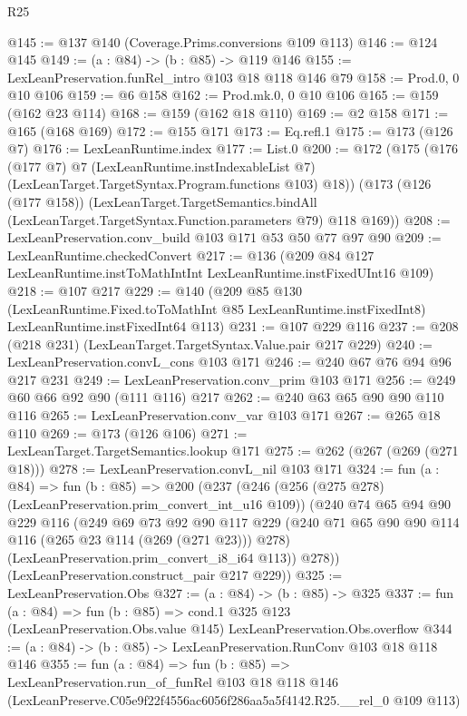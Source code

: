 \begin{lexlean}{R25}
\begin{coremodule}
@145 := @137 @140 (Coverage.Prims.conversions @109 @113)
@146 := @124 @145
@149 := (a : @84) -> (b : @85) -> @119 @146
@155 := LexLeanPreservation.funRel_intro @103 @18 @118 @146 @79
@158 := Prod.{0, 0} @10 @106
@159 := @6 @158
@162 := Prod.mk.{0, 0} @10 @106
@165 := @159 (@162 @23 @114)
@168 := @159 (@162 @18 @110)
@169 := @2 @158
@171 := @165 (@168 @169)
@172 := @155 @171
@173 := Eq.refl.{1}
@175 := @173 (@126 @7)
@176 := LexLeanRuntime.index
@177 := List.{0}
@200 := @172
    (@175
      (@176
        (@177 @7)
        @7
        (LexLeanRuntime.instIndexableList @7)
        (LexLeanTarget.TargetSyntax.Program.functions @103)
        @18))
    (@173
      (@126 (@177 @158))
      (LexLeanTarget.TargetSemantics.bindAll
        (LexLeanTarget.TargetSyntax.Function.parameters @79)
        @118
        @169))
@208 := LexLeanPreservation.conv_build @103 @171 @53 @50 @77 @97 @90
@209 := LexLeanRuntime.checkedConvert
@217 := @136 (@209 @84 @127 LexLeanRuntime.instToMathIntInt LexLeanRuntime.instFixedUInt16 @109)
@218 := @107 @217
@229 := @140
    (@209
      @85
      @130
      (LexLeanRuntime.Fixed.toToMathInt @85 LexLeanRuntime.instFixedInt8)
      LexLeanRuntime.instFixedInt64
      @113)
@231 := @107 @229 @116
@237 := @208 (@218 @231) (LexLeanTarget.TargetSyntax.Value.pair @217 @229)
@240 := LexLeanPreservation.convL_cons @103 @171
@246 := @240 @67 @76 @94 @96 @217 @231
@249 := LexLeanPreservation.conv_prim @103 @171
@256 := @249 @60 @66 @92 @90 (@111 @116) @217
@262 := @240 @63 @65 @90 @90 @110 @116
@265 := LexLeanPreservation.conv_var @103 @171
@267 := @265 @18 @110
@269 := @173 (@126 @106)
@271 := LexLeanTarget.TargetSemantics.lookup @171
@275 := @262 (@267 (@269 (@271 @18)))
@278 := LexLeanPreservation.convL_nil @103 @171
@324 := fun (a : @84) =>
  fun (b : @85) =>
  @200
    (@237
      (@246
        (@256 (@275 @278) (LexLeanPreservation.prim_convert_int_u16 @109))
        (@240
          @74
          @65
          @94
          @90
          @229
          @116
          (@249
            @69
            @73
            @92
            @90
            @117
            @229
            (@240 @71 @65 @90 @90 @114 @116 (@265 @23 @114 (@269 (@271 @23))) @278)
            (LexLeanPreservation.prim_convert_i8_i64 @113))
          @278))
      (LexLeanPreservation.construct_pair @217 @229))
@325 := LexLeanPreservation.Obs
@327 := (a : @84) -> (b : @85) -> @325
@337 := fun (a : @84) =>
  fun (b : @85) =>
  cond.{1} @325 @123 (LexLeanPreservation.Obs.value @145) LexLeanPreservation.Obs.overflow
@344 := (a : @84) -> (b : @85) -> LexLeanPreservation.RunConv @103 @18 @118 @146
@355 := fun (a : @84) =>
  fun (b : @85) =>
  LexLeanPreservation.run_of_funRel
    @103
    @18
    @118
    @146
    (LexLeanPreserve.C05e9f22f4556ac6056f286aa5a5f4142.R25.__rel_0 @109 @113)
\end{coremodule}
\end{lexlean}
